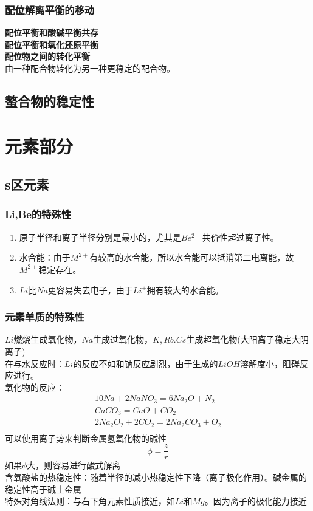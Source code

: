 \documentclass[utf8,a4paper,12pt]{ctexart}
\begin{document}
\subsubsection{配位解离平衡的移动}
{\bf 配位平衡和酸碱平衡共存}\\
{\bf 配位平衡和氧化还原平衡}\\
{\bf 配位物之间的转化平衡}\\
由一种配合物转化为另一种更稳定的配合物。\\
\subsection{螯合物的稳定性}

\newpage
\section{元素部分}
\subsection{s区元素}
\subsubsection{Li,Be的特殊性}
\begin{enumerate}[(1)]
\item 原子半径和离子半径分别是最小的，尤其是$Be^{2+}$共价性超过离子性。
\item 水合能：由于$M^{2+}$有较高的水合能，所以水合能可以抵消第二电离能，故$M^{2+}$稳定存在。
\item $Li$比$Na$更容易失去电子，由于$Li^{+}$拥有较大的水合能。
\end{enumerate}
\subsubsection{元素单质的特殊性}
$Li$燃烧生成氧化物，$Na$生成过氧化物，$K,Rb.Cs$生成超氧化物(大阳离子稳定大阴离子)\\
在与水反应时：$Li$的反应不如和钠反应剧烈，由于生成的$LiOH$溶解度小，阻碍反应进行。\\
氧化物的反应：
\begin{align*}
10Na + 2NaNO_3 = 6Na_2O + N_2\\
CaCO_3 = CaO + CO_2\\
2Na_2O_2 + 2CO_2 = 2Na_2CO_3 + O_2\\
\end{align*}
可以使用离子势来判断金属氢氧化物的碱性
\[\phi = \frac{z}{r}\]
如果$\phi$大，则容易进行酸式解离\\
含氧酸盐的热稳定性：随着半径的减小热稳定性下降（离子极化作用）。碱金属的稳定性高于碱土金属\\
特殊对角线法则：与右下角元素性质接近，如$Li$和$Mg$。因为离子的极化能力接近\\
\end{document}
